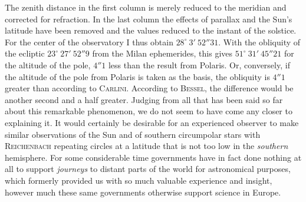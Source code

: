 \par\indent The zenith distance in the first column is merely reduced to the meridian and corrected for refraction. In the last column the effects of parallax and the Sun’s latitude have been removed and the values reduced to the instant of the solstice. For the center of the observatory I thus obtain $28^\circ\ 3'\ 52''31$. With the obliquity of the ecliptic $23^\circ\ 27'\ 52''9$ from the Milan ephemerides, this gives $51^\circ\ 31'\ 45''21$ for the altitude of the pole, $4''1$ less than the result from Polaris. Or, conversely, if the altitude of the pole from Polaris is taken as the basis, the obliquity is $4''1$ greater than according to \textsc{Carlini}. According to \textsc{Bessel}, the difference would be another second and a half greater. Judging from all that has been said so far about this remarkable phenomenon, we do not seem to have come any closer to explaining it. It would certainly be desirable for an experienced observer to make similar observations of the Sun and of southern circumpolar stars with \textsc{Reichenbach} repeating circles at a latitude that is not too low in the \emph{southern} hemisphere. For some considerable time governments have in fact done nothing at all to support \emph{journeys} to distant parts of the world for astronomical purposes, which formerly provided us with so much valuable experience and insight, however much these same governments otherwise support science in Europe.
